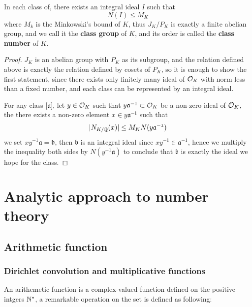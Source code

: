 \begin{colorlemma}
    In each class of, there exists an integral ideal \(I\) such that
    \[N(I) \leq M_K\]
where \(M_k\) is the Minkowski's bound of \(K\), thus \(J_K/P_K\) is exactly a finite abelian group, and we call it the \textbf{class group} of \(K\), and its order is called the \textbf{class number} of \(K\).
\end{colorlemma}
\begin{proof}
    \(J_K\) is an abelian group with \(P_K\) as its subgroup, and the relation defined above is exactly the relation defined by cosets of \(P_K\), so it is enough to show the first statement, since there exists only finitely many ideal of \(\mathcal{O}_K\) with norm less than a fixed number, and each class can be represented by an integral ideal.

    For any class [\(\mathfrak{a}\)], let \(y \in \mathcal{O}_K\) such that \(y\mathfrak{a}^{-1} \subset \mathcal{O}_K\) be a non-zero ideal of \(\mathcal{O}_K\), the there exists a non-zero element \(x \in y\mathfrak{a}^{-1}\) such that
    \[|N_{K/\mathbb{Q}}(x)| \leq M_K N(y\mathfrak{a^{-1}})\]
    we set \(xy^{-1}\mathfrak{a} = \mathfrak{b}\), then \(\mathfrak{b}\) is an integral ideal since \(xy^{-1} \in \mathfrak{a}^{-1}\), hence we multiply the inequality both sides by \(N(y^{-1}\mathfrak{a})\) to conclude that \(\mathfrak{b}\) is exactly the ideal we hope for the class.
\end{proof}




\newpage 



 






\newpage

\section{Analytic approach to number theory}

\subsection{Arithmetic function}
\subsubsection{Dirichlet convolution and multiplicative functions}
An arithemetic function is a complex-valued function defined on the positive intgers \(\mathbb{N}^*\), a remarkable operation on the set is defined as following:

